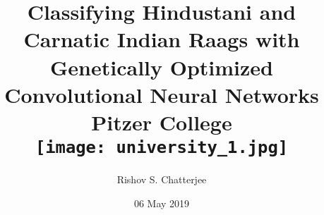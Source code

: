 \documentclass[12pt]{report}
\title{
{Classifying Hindustani and Carnatic Indian Raags with Genetically Optimized Convolutional Neural Networks}\\
{\large Pitzer College}\\
{\texttt{[image: university\_1.jpg]}}
}
\author{Rishov S. Chatterjee}
\date{06 May 2019}
\begin{document}
\maketitle{}
\end{document}
